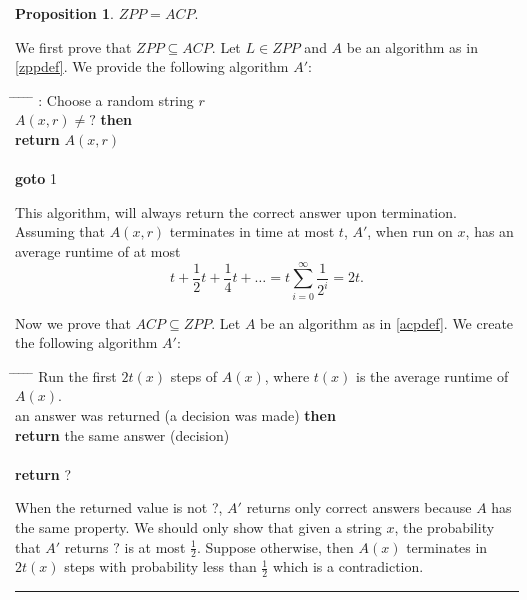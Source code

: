 \documentclass[a4paper,10pt]{article}
\newtheorem{proposition}[theorem]{Proposition}
\newenvironment{proof}{{\bf Proof:}}{\hfill\rule{2mm}{2mm}}
\begin{document}
\begin{proposition}
$ZPP = ACP.$
\end{proposition}
\begin{proof}
We first prove that $ZPP \subseteq ACP$. Let $L \in ZPP$ and $A$ be an algorithm as in \ref{zppdef}. We provide the following algorithm $A'$:
\begin{tabbing}
\hspace*{.25in} \= \hspace*{.25in} \= \hspace*{.25in} \= \hspace*{.25in} \= \hspace*{.25in} \=\kill
{}: Choose a random string $r$\\
 $A(x, r) \not = ?$ {\bf then } \\
\>\> {\bf return} $A(x, r)$ \\
 \\
\>\> {\bf goto} 1\\
\end{tabbing}

This algorithm, will always return the correct answer upon termination. Assuming that $A(x, r)$ terminates in time at most $t$, $A'$, when run on $x$, has an average runtime of at most $$t + \frac{1}{2} t + \frac{1}{4} t + \ldots = t \sum_{i=0}^\infty \frac{1}{2^i} = 2t.$$

Now we prove that $ACP \subseteq ZPP$. Let $A$ be an algorithm as in \ref{acpdef}. We create the following algorithm $A'$:

\begin{tabbing}
\hspace*{.25in} \= \hspace*{.25in} \= \hspace*{.25in} \= \hspace*{.25in} \= \hspace*{.25in} \=\kill
\> Run the first $2 t(x)$ steps of $A(x)$, where $t(x)$ is the average runtime of $A(x)$. \\
 an answer was returned (a decision was made) {\bf then } \\
\>\> {\bf return} the same answer (decision) \\
 \\
\>\> {\bf return} ?\\
\end{tabbing}

When the returned value is not ?, $A'$ returns only correct answers because $A$ has the same property. We should only show that given a string $x$, the probability that $A'$ returns $?$ is at most $\frac{1}{2}$. Suppose otherwise, then $A(x)$ terminates in $2 t(x)$ steps with probability less than $\frac{1}{2}$ which is a contradiction.

\end{proof}
\end{document}
